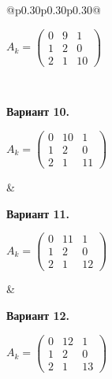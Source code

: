 \documentclass[12pt,a4paper]{article}
\begin{document}
{\begin{longtable}{@{}p{0.30\textwidth}p{0.30\textwidth}p{0.30\textwidth}@{}}
\begin{minipage}[t]{\linewidth}
\(\displaystyle A_k=\begin{pmatrix}0&9&1\\1&2&0\\2&1&10\end{pmatrix}\)\par
\end{minipage}\\\noalign{\vskip 14pt}
\begin{minipage}[t]{\linewidth}\vspace{0pt}\raggedright\setlength{\parskip}{0pt}
\textbf{Вариант 10.}\par\smallskip
\(\displaystyle A_k=\begin{pmatrix}0&10&1\\1&2&0\\2&1&11\end{pmatrix}\)\par
\end{minipage} &
\begin{minipage}[t]{\linewidth}\vspace{0pt}\raggedright\setlength{\parskip}{0pt}
\textbf{Вариант 11.}\par\smallskip
\(\displaystyle A_k=\begin{pmatrix}0&11&1\\1&2&0\\2&1&12\end{pmatrix}\)\par
\end{minipage} &
\begin{minipage}[t]{\linewidth}\vspace{0pt}\raggedright\setlength{\parskip}{0pt}
\textbf{Вариант 12.}\par\smallskip
\(\displaystyle A_k=\begin{pmatrix}0&12&1\\1&2&0\\2&1&13\end{pmatrix}\)\par
\end{minipage}\\\noalign{\vskip 14pt}
\end{longtable}
}

\par\ifdim\dimexpr\pagegoal-\pagetotal\relax<140pt\relax\newpage\fi
\end{document}
